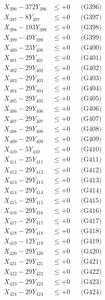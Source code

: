 \documentclass[a4paper,10pt]{article}
\begin{document}
{\begin{align}
X_{396} - 372Y_{396} &\leq +0 && \text{(G396)} \\
X_{397} - 8Y_{397} &\leq +0 && \text{(G397)} \\
X_{398} - 193Y_{398} &\leq +0 && \text{(G398)} \\
X_{399} - 49Y_{399} &\leq +0 && \text{(G399)} \\
X_{400} - 23Y_{400} &\leq +0 && \text{(G400)} \\
\allowbreak
X_{401} - 29Y_{401} &\leq +0 && \text{(G401)} \\
X_{402} - 29Y_{402} &\leq +0 && \text{(G402)} \\
X_{403} - 29Y_{403} &\leq +0 && \text{(G403)} \\
X_{404} - 29Y_{404} &\leq +0 && \text{(G404)} \\
X_{405} - 29Y_{405} &\leq +0 && \text{(G405)} \\
X_{406} - 29Y_{406} &\leq +0 && \text{(G406)} \\
X_{407} - 29Y_{407} &\leq +0 && \text{(G407)} \\
X_{408} - 29Y_{408} &\leq +0 && \text{(G408)} \\
X_{409} - 29Y_{409} &\leq +0 && \text{(G409)} \\
X_{410} - 5Y_{410} &\leq +0 && \text{(G410)} \\
\allowbreak
X_{411} - 25Y_{411} &\leq +0 && \text{(G411)} \\
X_{412} - 29Y_{412} &\leq +0 && \text{(G412)} \\
X_{413} - 29Y_{413} &\leq +0 && \text{(G413)} \\
X_{414} - 29Y_{414} &\leq +0 && \text{(G414)} \\
X_{415} - 29Y_{415} &\leq +0 && \text{(G415)} \\
X_{416} - 29Y_{416} &\leq +0 && \text{(G416)} \\
X_{417} - 29Y_{417} &\leq +0 && \text{(G417)} \\
X_{418} - 29Y_{418} &\leq +0 && \text{(G418)} \\
X_{419} - 12Y_{419} &\leq +0 && \text{(G419)} \\
X_{420} - 29Y_{420} &\leq +0 && \text{(G420)} \\
\allowbreak
X_{421} - 29Y_{421} &\leq +0 && \text{(G421)} \\
X_{422} - 29Y_{422} &\leq +0 && \text{(G422)} \\
X_{423} - 29Y_{423} &\leq +0 && \text{(G423)} \\
X_{424} - 29Y_{424} &\leq +0 && \text{(G424)} \\

\end{align}}
\end{document}
